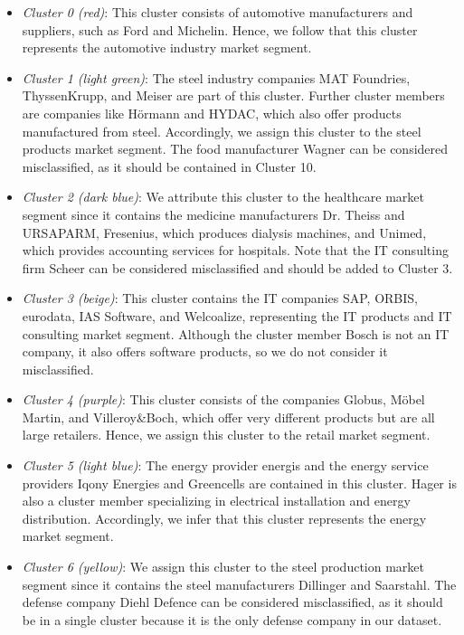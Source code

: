 \documentclass[conference]{IEEEtran}
\begin{document}
\begin{itemize}
	\item \textit{Cluster 0 (red)}: This cluster consists of automotive manufacturers and suppliers, such as Ford and Michelin. Hence, we follow that this cluster represents the automotive industry market segment.
	
	\item \textit{Cluster 1 (light green)}: The steel industry companies MAT Foundries, ThyssenKrupp, and Meiser are part of this cluster. Further cluster members are companies like Hörmann and HYDAC, which also offer products manufactured from steel. Accordingly, we assign this cluster to the steel products market segment. The food manufacturer Wagner can be considered misclassified, as it should be contained in Cluster 10.
	
	\item \textit{Cluster 2 (dark blue)}: We attribute this cluster to the healthcare market segment since it contains the medicine manufacturers Dr. Theiss and URSAPARM, Fresenius, which produces dialysis machines, and Unimed, which provides accounting services for hospitals. Note that the IT consulting firm Scheer can be considered misclassified and should be added to Cluster 3.
	
	\item \textit{Cluster 3 (beige)}: This cluster contains the IT companies SAP, ORBIS, eurodata, IAS Software, and Welcoalize, representing the IT products and IT consulting market segment. Although the cluster member Bosch is not an IT company, it also offers software products, so we do not consider it misclassified.
	
	\item \textit{Cluster 4 (purple)}: This cluster consists of the companies Globus, Möbel Martin, and Villeroy\&Boch, which offer very different products but are all large retailers. Hence, we assign this cluster to the retail market segment. 
	
	\item \textit{Cluster 5 (light blue)}: The energy provider energis and the energy service providers Iqony Energies and Greencells are contained in this cluster. Hager is also a cluster member specializing in electrical installation and energy distribution. Accordingly, we infer that this cluster represents the energy market segment.
	
	\item \textit{Cluster 6 (yellow)}: We assign this cluster to the steel production market segment since it contains the steel manufacturers Dillinger and Saarstahl. The defense company Diehl Defence can be considered misclassified, as it should be in a single cluster because it is the only defense company in our dataset.
	

\end{itemize}
\end{document}
